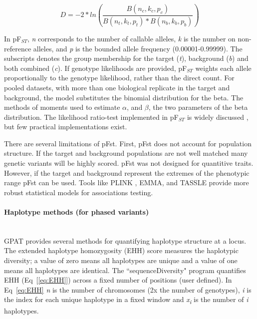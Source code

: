\documentclass[10pt,letterpaper]{article}
\begin{document}
\begin{equation}\label{eq:pfst} 
D=-2* ln (\frac{ B(n_c,k_c,p_c) }{ B(n_t,k_t,p_t)*B(n_b,k_b,p_b)  })
\end{equation}

In pF$_{ST}$, \textit{n} corresponds to the number of callable alleles, \textit{k} is the number on non-reference alleles, and \textit{p} is the bounded allele frequency (0.00001-0.99999).  The subscripts denotes the group membership for the target (\textit{t}), background (\textit{b}) and both combined (\textit{c}).  If genotype likelihoods are provided, pF$_{ST}$  weights each allele proportionally to the genotype likelihood, rather than the direct count.   For pooled datasets, with more than one biological replicate in the target and background, the model substitutes the binomial distribution for the beta.  The methods of moments used to estimate $\alpha$, and $\beta$, the two parameters of the beta distribution.  The likelihood ratio-test implemented in pF$_{ST}$ is widely discussed \cite{kim,heng}, but few practical implementations exist.  

There are several limitations of pFst.  First, pFst does not account for population structure.  If the target and background populations are not well matched many genetic variants will be highly scored.  pFst was not designed for quantitive traits.  However, if the target and background represent the extremes of the phenotypic range pFst can be used.  Tools like PLINK \cite{plink}, EMMA\cite{emma}, and TASSLE\cite{tassel} provide more robust statistical models for associations testing.

\paragraph*{Haplotype methods (for phased variants) }\mbox{} \\

GPAT provides several methods for quantifying haplotype structure at a locus.  The extended haplotype homozygosity (EHH) score measures the haplotypic diversity; a value of zero means all haplotypes are unique and a value of one means all haplotypes are identical. The ``sequenceDiversity" program quantifies EHH (Eq~[\ref{eq:EHH}]) across a fixed number of positions (user defined). In Eq~\ref{eq:EHH} \textit{n} is the number of chromosomes (2x the number of genotypes), \textit{i} is the index for each unique haplotype in a fixed window and \textit{x\textsubscript{i}} is the number of \textit{i} haplotypes.  
\end{document}
